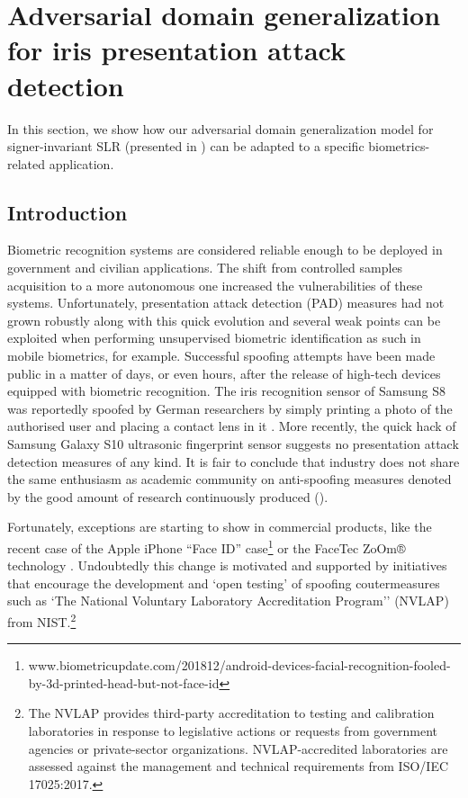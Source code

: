 \section{Adversarial domain generalization for iris presentation attack detection}
\label{sec:adv_iris_attack}
In this section, we show how our adversarial domain generalization model for signer-invariant SLR (presented in ) can be adapted to a specific biometrics-related application.

\subsection{Introduction}
\label{sec:adv_iris_attack_intro}
Biometric recognition systems are considered reliable enough to be deployed in government and civilian applications. The shift from controlled samples acquisition to a more autonomous one increased the vulnerabilities of these systems. Unfortunately, presentation attack detection (PAD) measures had not grown robustly along with this quick evolution and several weak points can be exploited when performing unsupervised biometric identification as such in mobile biometrics, for example. Successful spoofing attempts have been made public in a matter of days, or even hours, after the release of high-tech devices equipped with biometric recognition. The iris recognition sensor of Samsung S8 was reportedly spoofed by German researchers by simply printing a photo of the authorised user and placing a contact lens in it \cite{cccsamsung2017}. More recently, the quick hack of Samsung Galaxy S10 ultrasonic fingerprint sensor suggests no presentation attack detection measures of any kind. It is fair to conclude that industry does not share the same enthusiasm as academic community on anti-spoofing measures denoted by the good amount of research continuously produced (\citet{raghavendra2015VSIA,czajka2018irisPADreview,Galbally2019,scherhag2019}).

Fortunately, exceptions are starting to show in commercial products, like the recent case of the Apple iPhone ``Face ID'' case\footnote{www.biometricupdate.com/201812/android-devices-facial-recognition-fooled-by-3d-printed-head-but-not-face-id} or the FaceTec ZoOm® technology \cite{facetec102019}. Undoubtedly this change is motivated and supported by initiatives that encourage the development and `open testing' of spoofing coutermeasures such as `The National Voluntary Laboratory Accreditation Program'' (NVLAP) from NIST.\footnote{The NVLAP provides third-party accreditation to testing and calibration laboratories in response to legislative actions or requests from government agencies or private-sector organizations. NVLAP-accredited laboratories are assessed against the management and technical requirements from ISO/IEC 17025:2017.}

